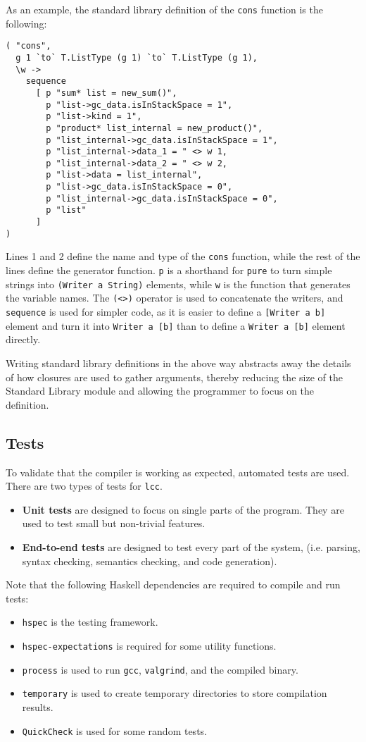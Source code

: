 \documentclass[12pt]{article}
\begin{document}
As an example, the standard library definition of the \verb$cons$ function is
the following:
\lstset{numbers=left}
\begin{lstlisting}
( "cons",
  g 1 `to` T.ListType (g 1) `to` T.ListType (g 1),
  \w ->
    sequence
      [ p "sum* list = new_sum()",
        p "list->gc_data.isInStackSpace = 1",
        p "list->kind = 1",
        p "product* list_internal = new_product()",
        p "list_internal->gc_data.isInStackSpace = 1",
        p "list_internal->data_1 = " <> w 1,
        p "list_internal->data_2 = " <> w 2,
        p "list->data = list_internal",
        p "list->gc_data.isInStackSpace = 0",
        p "list_internal->gc_data.isInStackSpace = 0",
        p "list"
      ]
)
\end{lstlisting}
Lines 1 and 2 define the name and type of the \verb$cons$ function, while the
rest of the lines define the generator function. \verb$p$ is a shorthand for
\verb$pure$ to turn simple strings into \verb$(Writer a String)$ elements, while
\verb$w$ is the function that generates the variable names. The \verb$(<>)$
operator is used to concatenate the writers, and \verb$sequence$ is used for
simpler code, as it is easier to define a \verb$[Writer a b]$ element and turn
it into \verb$Writer a [b]$ than to define a \verb$Writer a [b]$ element
directly.

Writing standard library definitions in the above way abstracts away the details
of how closures are used to gather arguments, thereby reducing the size of the
Standard Library module and allowing the programmer to focus on the definition.

\subsection{Tests}

To validate that the compiler is working as expected, automated tests are used.
There are two types of tests for \verb$lcc$.
\begin{itemize}
    \item \textbf{Unit tests} are designed to focus on single parts of the program.
        They are used to test small but non-trivial features.
    \item \textbf{End-to-end tests} are designed to test every part of the
        system, (i.e. parsing, syntax checking, semantics checking, and code
        generation). 
\end{itemize}
Note that the following Haskell dependencies are required to compile and run
tests:
\begin{itemize}
    \item \verb$hspec$ is the testing framework.
    \item \verb$hspec-expectations$ is required for some utility functions.
    \item \verb$process$ is used to run \verb$gcc$, \verb$valgrind$, and the
        compiled binary.
    \item \verb$temporary$ is used to create temporary directories to store
        compilation results.
    \item \verb$QuickCheck$ is used for some random tests.
\end{itemize}
\end{document}
